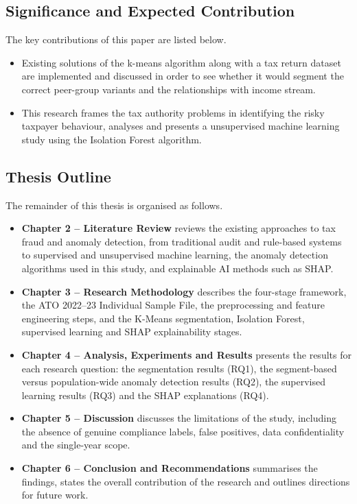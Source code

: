 \subsection{Significance and Expected Contribution}

The key contributions of this paper are listed below.

\begin{itemize}
    \item Existing solutions of the k-means algorithm along with a tax return dataset are implemented and discussed in order to see whether it would segment the correct peer-group variants and the relationships with income stream.
    \item This research frames the tax authority problems in identifying the risky taxpayer behaviour, analyses and presents a unsupervised machine learning study using the Isolation Forest algorithm.
\end{itemize}

\subsection{Thesis Outline}

The remainder of this thesis is organised as follows.

\begin{itemize}
    \item \textbf{Chapter 2 -- Literature Review} reviews the existing approaches to tax fraud and anomaly detection, from traditional audit and rule-based systems to supervised and unsupervised machine learning, the anomaly detection algorithms used in this study, and explainable AI methods such as SHAP.
    \item \textbf{Chapter 3 -- Research Methodology} describes the four-stage framework, the ATO 2022--23 Individual Sample File, the preprocessing and feature engineering steps, and the K-Means segmentation, Isolation Forest, supervised learning and SHAP explainability stages.
    \item \textbf{Chapter 4 -- Analysis, Experiments and Results} presents the results for each research question: the segmentation results (RQ1), the segment-based versus population-wide anomaly detection results (RQ2), the supervised learning results (RQ3) and the SHAP explanations (RQ4).
    \item \textbf{Chapter 5 -- Discussion} discusses the limitations of the study, including the absence of genuine compliance labels, false positives, data confidentiality and the single-year scope.
    \item \textbf{Chapter 6 -- Conclusion and Recommendations} summarises the findings, states the overall contribution of the research and outlines directions for future work.
\end{itemize}
